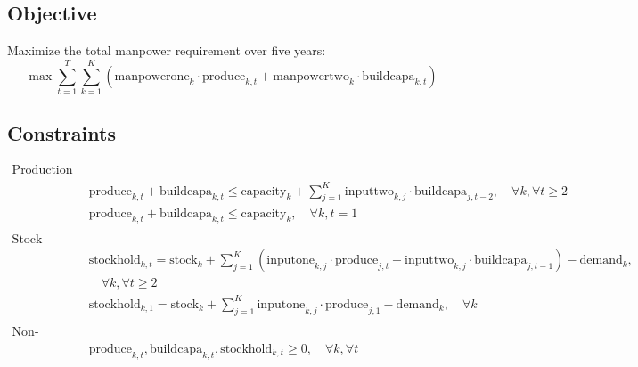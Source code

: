 \documentclass{article}
\begin{document}
\subsection*{Objective}

Maximize the total manpower requirement over five years:
\[
\max \sum_{t=1}^T \sum_{k=1}^K (\text{manpowerone}_k \cdot \text{produce}_{k,t} + \text{manpowertwo}_k \cdot \text{buildcapa}_{k,t})
\]

\subsection*{Constraints}

\begin{align*}
    \text{Production and Capacity Constraints:} \\
    & \text{produce}_{k,t} + \text{buildcapa}_{k,t} \leq \text{capacity}_k + \sum_{j=1}^{K} \text{inputtwo}_{k,j} \cdot \text{buildcapa}_{j,t-2}, \quad \forall k, \forall t \geq 2 \\
    & \text{produce}_{k,t} + \text{buildcapa}_{k,t} \leq \text{capacity}_k, \quad \forall k, t = 1 \\
    \\
    \text{Stock Constraints:} \\
    & \text{stockhold}_{k,t} = \text{stock}_k + \sum_{j=1}^{K} (\text{inputone}_{k,j} \cdot \text{produce}_{j,t} + \text{inputtwo}_{k,j} \cdot \text{buildcapa}_{j,t-1}) - \text{demand}_k, \\
    & \quad \forall k, \forall t \geq 2 \\
    & \text{stockhold}_{k,1} = \text{stock}_k + \sum_{j=1}^{K} \text{inputone}_{k,j} \cdot \text{produce}_{j,1} - \text{demand}_k, \quad \forall k \\
    \\
    \text{Non-negativity Constraints:} \\
    & \text{produce}_{k,t}, \text{buildcapa}_{k,t}, \text{stockhold}_{k,t} \geq 0, \quad \forall k, \forall t \\
\end{align*}
\end{document}
